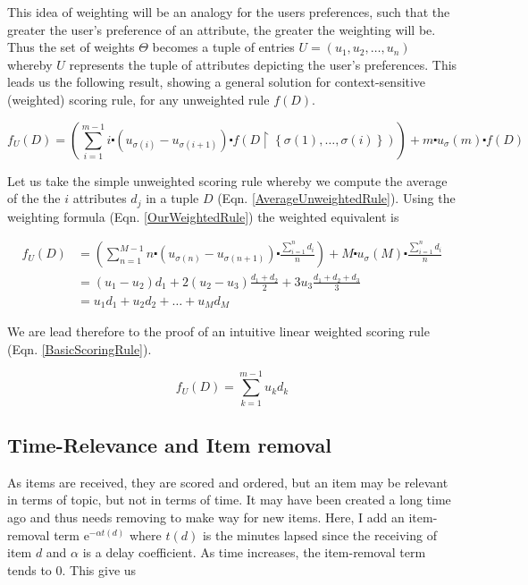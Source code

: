 This idea of weighting will be an analogy for the users preferences, such that the greater the user's preference of an attribute, the greater the weighting will be. Thus the set of weights $\Theta$ becomes a tuple of entries $ U = (u_1, u_2, \dots, u_n)$ whereby $U$ represents the tuple of attributes depicting the user's preferences. This leads us the following result, showing a general solution for context-sensitive (weighted) scoring rule, for any unweighted rule $f(D)$.

\begin{equation}\label{OurWeightedRule}	
	f_U (D) = \left(\sum_{i=1}^{m-1} i\centerdot (u_{\sigma{(i)}} - u_{\sigma{(i+1)}})\centerdot f(D\upharpoonright\left\{\sigma(1),\dots,\sigma(i)\right\})\right) + m \centerdot u_\sigma{(m)} \centerdot f(D)
\end{equation}

Let us take the simple unweighted scoring rule whereby we compute the average of the the $i$ attributes $d_j$ in a tuple $D$ (Eqn. \ref{AverageUnweightedRule}). Using the weighting formula (Eqn. \ref{OurWeightedRule}) the weighted equivalent is

\begin{align}\label{OurWeightedRuleDerivation}
f_U (D) &= \left(\sum_{n=1}^{M-1} n\centerdot (u_{\sigma{(n)}} - u_{\sigma{(n+1)}})\centerdot \frac{\sum_{i=1}^{n} d_i}{n}\right) + M \centerdot u_\sigma{(M)} \centerdot \frac{\sum_{i=1}^{n} d_i}{n} 
\\ &= (u_1-u_2)d_1 + 2(u_2-u_3)\frac{d_1+d_2}{2} + 3u_3\frac{d_1+d_2+d_3}{3}
\\ &= u_1d_1 + u_2d_2 + \dots + u_Md_M
\end{align}

We are lead therefore to the proof of an intuitive linear weighted scoring rule (Eqn. \ref{BasicScoringRule}).

\begin{equation}\label{BasicScoringRule}
f_U (D) = \sum_{k=1}^{m-1} u_kd_k
\end{equation}

\subsection{Time-Relevance and Item removal}

As items are received, they are scored and ordered, but an item may be relevant in terms of topic, but not in terms of time. It may have been created a long time ago and thus needs removing to make way for new items. Here, I add an item-removal term ${\mathrm{e}}^{-\alpha t(d)}$ where $t(d)$ is the minutes lapsed since the receiving of item $d$ and $\alpha$ is a delay coefficient. As time increases, the item-removal term tends to 0. This give us

